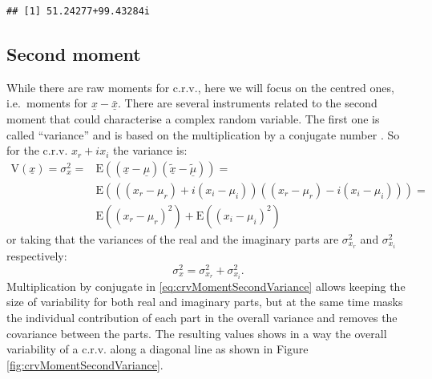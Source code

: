 \documentclass[
]{book}
\begin{document}
\begin{verbatim}
## [1] 51.24277+99.43284i
\end{verbatim}

\hypertarget{crvSecondMoment}{%
\subsection{Second moment}\label{crvSecondMoment}}

While there are raw moments for c.r.v., here we will focus on the centred ones, i.e.~moments for \(\underline{x}-\bar{\underline{x}}\). There are several instruments related to the second moment that could characterise a complex random variable. The first one is called ``variance'' and is based on the multiplication by a conjugate number \citep{reference}. So for the c.r.v. \(x_r + i x_i\) the variance is:
\begin{equation}
    \begin{aligned}
    \mathrm{V}(\underline{x}) = \sigma_x^2 = & \mathrm{E}((\underline{x}-\underline{\mu}) (\tilde{\underline{x}}-\tilde{\underline{\mu}})) = \\
                 & \mathrm{E}\left(((x_r-\mu_{r}) + i (x_i-\mu_{i}))((x_r-\mu_{r}) - i (x_i-\mu_{i}))\right) = \\
                 & \mathrm{E}((x_r-\mu_{r})^2) +  \mathrm{E}((x_i-\mu_{i})^2)
    \end{aligned}
    \label{eq:crvMomentSecondVariance}
\end{equation}
or taking that the variances of the real and the imaginary parts are \(\sigma_{x_r}^2\) and \(\sigma_{x_i}^2\) respectively:
\begin{equation}
    \sigma_x^2 = \sigma_{x_r}^2 + \sigma_{x_i}^2.
    \label{eq:crvMomentSecondVarianceShort}
\end{equation}
Multiplication by conjugate in \eqref{eq:crvMomentSecondVariance} allows keeping the size of variability for both real and imaginary parts, but at the same time masks the individual contribution of each part in the overall variance and removes the covariance between the parts. The resulting values shows in a way the overall variability of a c.r.v. along a diagonal line as shown in Figure \ref{fig:crvMomentSecondVariance}.
\end{document}
